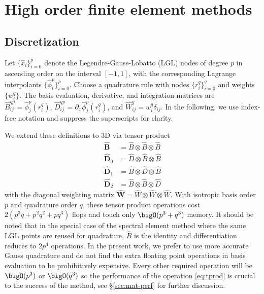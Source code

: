 \section{High order finite element methods}\label{sec:hpfem}

\subsection{Discretization}
Let $\{\hat x_i\}_{i=0}^p$ denote the Legendre-Gauss-Lobatto (LGL) nodes of degree $p$ in ascending order on the
interval $[-1,1]$, with the corresponding Lagrange interpolants $\{\hat\phi_i^p\}_{i=0}^p$.  Choose a quadrature rule
with nodes $\{r_i^q\}_{i=0}^q$ and weights $\{w_i^q\}$.  The basis evaluation, derivative, and integration matrices are
$\hat B_{ij}^{qp} = \hat\phi_j^p(r_i^q)$, $\hat D_{ij}^{qp} = \partial_x \hat\phi_j^p(r_i^q)$, and $\hat W^q_{ij} =
w_i^q\delta_{ij}$.  In the following, we use index-free notation and suppress the superscripts for clarity.

We extend these definitions to 3D via tensor product
\begin{equation}\label{eq:tprod}
  \begin{split}
    \hat{\bm B} &= \hat B \otimes \hat B \otimes \hat B \\
    \hat{\bm D}_0 &= \hat D \otimes \hat B \otimes \hat B \\
    \hat{\bm D}_1 &= \hat B \otimes \hat D \otimes \hat B \\
    \hat{\bm D}_2 &= \hat B \otimes \hat B \otimes \hat D
  \end{split}
\end{equation}
with the diagonal weighting matrix $\hat{\bm W} = \hat W \otimes \hat W \otimes \hat W$.  With isotropic basis order $p$
and quadrature order $q$, these tensor product operations cost $2(p^3 q + p^2 q^2 + pq^3)$ flops and touch only
$\bigO(p^3 + q^3)$ memory.  It should be noted that in the special case of the spectral element method where the same
LGL points are reused for quadrature, $\hat B$ is the identity and differentiation reduces to $2p^4$ operations.  In the
present work, we prefer to use more accurate Gauss quadrature and do not find the extra floating point operations in
basis evaluation to be prohibitively expensive.  Every other required operation will be $\bigO(p^3)$ or $\bigO(q^3)$ so
the performance of the operation \eqref{eq:tprod} is crucial to the success of the method, see
\S\ref{sec:mat-perf} for further discussion.


